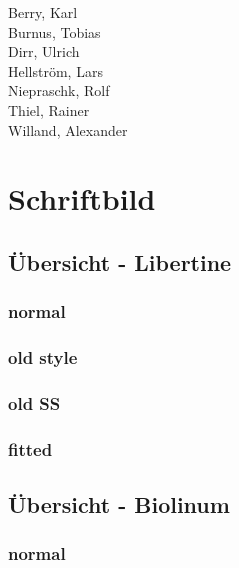 \documentclass{fontdokuold}
\begin{document}
\begin{multicols}{2}
Berry, Karl\\
Burnus, Tobias\\
Dirr, Ulrich\\
Hellström, Lars\\
Niepraschk, Rolf\\
Thiel, Rainer\\
Willand, Alexander\\
\end{multicols}












\chapter{Schriftbild}

\section{Übersicht - Libertine}

\subsection{normal}

\subsection{old style}

\subsection{old SS}

\subsection{fitted}

\section{Übersicht - Biolinum}

\subsection{normal}
\end{document}
